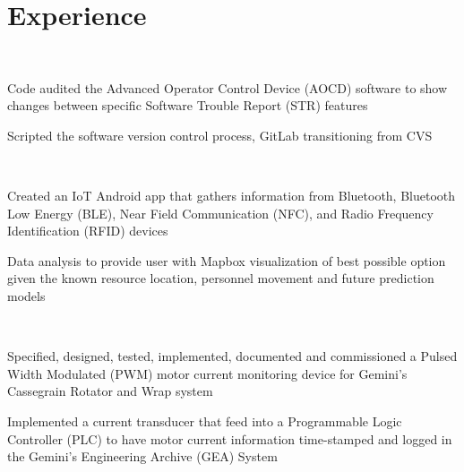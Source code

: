 \documentclass[]{wow}
\begin{document}
\begin{minipage}[t]{0.65\textwidth} 

\section{Experience}

\\
\vspace{0.9em} %
\begin{tightemize}
\small{}
\item Code audited the Advanced Operator Control Device (AOCD) software to show changes between specific Software Trouble Report (STR) features
\item Scripted the software version control process, GitLab transitioning from CVS 
\end{tightemize}
\sectionsep

 \\
\begin{tightemize}
\small{}
\item Created an IoT Android app that gathers information from 
    Bluetooth, Bluetooth Low Energy (BLE), Near Field Communication (NFC), and Radio Frequency Identification (RFID)
    devices
\item Data analysis to provide user with Mapbox visualization of best possible option given the known resource location, personnel movement and future prediction models
\end{tightemize}
\sectionsep

 \\
\begin{tightemize}
\small{}
\item Specified, designed, tested, implemented, documented and commissioned a Pulsed Width Modulated (PWM) motor current monitoring device for Gemini’s Cassegrain Rotator and Wrap system
\item Implemented a current transducer that feed into a Programmable Logic Controller (PLC) to have motor current information time-stamped and logged in the Gemini’s Engineering Archive (GEA) System
\end{tightemize}
\sectionsep


\end{minipage}
\end{document}
